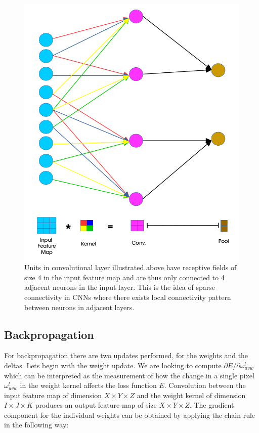 \documentclass[final, paper=letter,5p,times,twocolumn]{elsarticle}
\begin{document}
\begin{figure}[htbp]
   \begin{center}
      \includegraphics[scale=0.3, angle=0]{images/fCNN.png}
   \end{center}
   \caption{Units in convolutional layer illustrated above have receptive fields of size 4 in the input feature map and are thus only connected to 4 adjacent neurons in the input layer. This is the idea of sparse connectivity in CNNs where there exists local connectivity pattern between neurons in adjacent layers.}
  \label{fig:fCNN} 
\end{figure}

\subsection{Backpropagation}

For backpropagation there are two updates performed, for the weights and the deltas. Lets begin with the weight update. We are looking to compute $\partial E / \partial \omega_{uvw}^{l}$ which can be interpreted as the measurement of how the change in a single pixel $\omega_{uvw}^{l}$ in the weight kernel affects the loss function $E$. Convolution between the input feature map of dimension $X \times Y \times Z$  and the weight kernel of dimension $I \times J \times K$ produces an output feature map of size $X \times Y \times Z$. The gradient component for the individual weights can be obtained by applying the chain rule in the following way:
\end{document}
